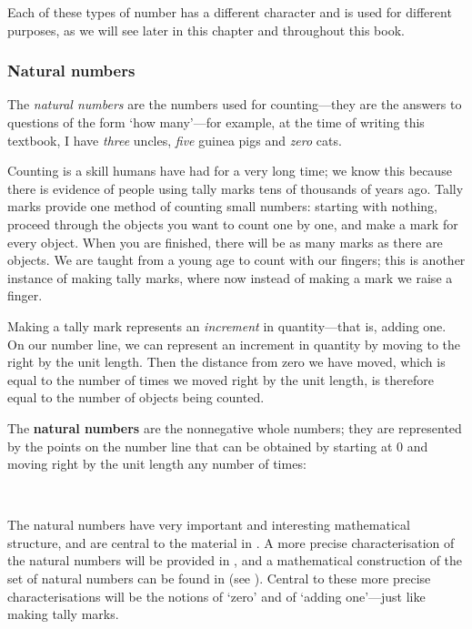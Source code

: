 Each of these types of number has a different character and is used for different purposes, as we will see later in this chapter and throughout this book.

\subsubsection*{Natural numbers}

The \textit{natural numbers} are the numbers used for counting---they are the answers to questions of the form `how many'---for example, at the time of writing this textbook, I have \textit{three} uncles, \textit{five} guinea pigs and \textit{zero} cats.

Counting is a skill humans have had for a very long time; we know this because there is evidence of people using tally marks tens of thousands of years ago. Tally marks provide one method of counting small numbers: starting with nothing, proceed through the objects you want to count one by one, and make a mark for every object. When you are finished, there will be as many marks as there are objects. We are taught from a young age to count with our fingers; this is another instance of making tally marks, where now instead of making a mark we raise a finger.

Making a tally mark represents an \textit{increment} in quantity---that is, adding one. On our number line, we can represent an increment in quantity by moving to the right by the unit length. Then the distance from zero we have moved, which is equal to the number of times we moved right by the unit length, is therefore equal to the number of objects being counted.

\begin{definition}
\label{defNaturalNumberInformal}
The \textbf{natural numbers} are the nonnegative whole numbers; they are represented by the points on the number line that can be obtained by starting at $0$ and moving right by the unit length any number of times:
\begin{center}
\end{center}
~
\end{definition}

The natural numbers have very important and interesting mathematical structure, and are central to the material in . A more precise characterisation of the natural numbers will be provided in , and a mathematical construction of the set of natural numbers can be found in  (see ). Central to these more precise characterisations will be the notions of `zero' and of `adding one'---just like making tally marks.

